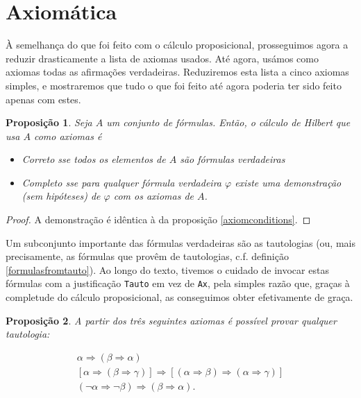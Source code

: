 \documentclass{report}
\newtheorem{prop}{Proposição}
\theoremstyle{definition}
\theoremstyle{remark}
\newcommand{\imply}{\mathbin{\Rightarrow}}
\begin{document}
	\section{Axiomática}

	À semelhança do que foi feito com o cálculo proposicional, prosseguimos agora a reduzir drasticamente a lista de axiomas usados. Até agora, usámos como axiomas todas as afirmações verdadeiras. Reduziremos esta lista a cinco axiomas simples, e mostraremos que tudo o que foi feito até agora poderia ter sido feito apenas com estes.

	\begin{prop}
	Seja $A$ um conjunto de fórmulas. Então, o cálculo de Hilbert que usa $A$ como axiomas é

	\begin{itemize}
	\item Correto sse todos os elementos de $A$ são fórmulas verdadeiras

	\item Completo sse para qualquer fórmula verdadeira $\varphi$ existe uma demonstração (sem hipóteses) de $\varphi$ com os axiomas de $A$.
	\end{itemize}
	\end{prop}

	\begin{proof}
	A demonstração é idêntica à da proposição \ref{axiomconditions}.
	\end{proof}

	Um subconjunto importante das fórmulas verdadeiras são as tautologias (ou, mais precisamente, as fórmulas que provêm de tautologias, c.f. definição \ref{formulasfromtauto}). Ao longo do texto, tivemos o cuidado de invocar estas fórmulas com a justificação \texttt{Tauto} em vez de \texttt{Ax}, pela simples razão que, graças à completude do cálculo proposicional, as conseguimos obter efetivamente de graça.

	\begin{prop}
	A partir dos três seguintes axiomas é possível provar qualquer tautologia:

	\begin{gather}
	\alpha \imply (\beta \imply \alpha)\label{fol:ax1}\\
	[\alpha \imply (\beta \imply \gamma)] \imply [(\alpha \imply \beta) \imply (\alpha \imply \gamma)]\label{fol:ax2}\\
	(\neg \alpha \imply \neg \beta) \imply (\beta \imply \alpha).\label{fol:ax3}
	\end{gather}
	\end{prop}
\end{document}
